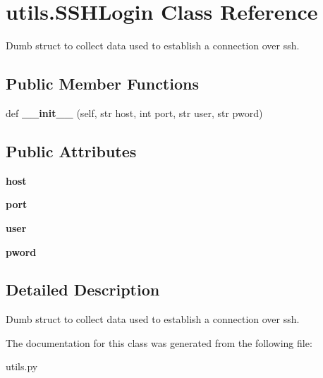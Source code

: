 \hypertarget{classutils_1_1_s_s_h_login}{}\section{utils.\+S\+S\+H\+Login Class Reference}
\label{classutils_1_1_s_s_h_login}


Dumb struct to collect data used to establish a connection over ssh.  


\subsection*{Public Member Functions}
\begin{DoxyCompactItemize}
\item 
\mbox{\label{classutils_1_1_s_s_h_login_a4d25cd8e78fe5107199f78f710d81401}} 
def {\bfseries \+\_\+\+\_\+init\+\_\+\+\_\+} (self, str host, int port, str user, str pword)
\end{DoxyCompactItemize}
\subsection*{Public Attributes}
\begin{DoxyCompactItemize}
\item 
\mbox{\label{classutils_1_1_s_s_h_login_aacbd2f89cb78cae53d4cf57fec5d5a87}} 
{\bfseries host}
\item 
\mbox{\label{classutils_1_1_s_s_h_login_a3821c994d8571b23ebd6382db8eceef8}} 
{\bfseries port}
\item 
\mbox{\label{classutils_1_1_s_s_h_login_a518f0d5b1e6c2c97ae47ea898a7786af}} 
{\bfseries user}
\item 
\mbox{\label{classutils_1_1_s_s_h_login_a85f8aacbfaff88813ea8c18dd2084f75}} 
{\bfseries pword}
\end{DoxyCompactItemize}


\subsection{Detailed Description}
Dumb struct to collect data used to establish a connection over ssh. 



The documentation for this class was generated from the following file\+:\begin{DoxyCompactItemize}
\item 
utils.\+py\end{DoxyCompactItemize}
